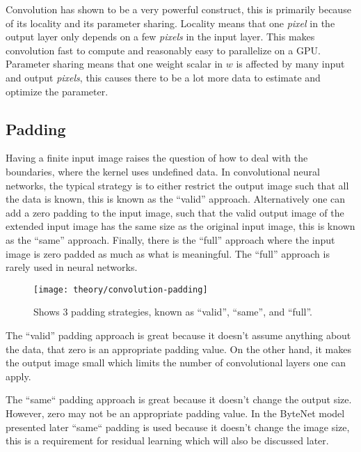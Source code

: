 Convolution has shown to be a very powerful construct, this is primarily because of its locality and its parameter sharing. Locality means that one \textit{pixel} in the output layer only depends on a few \textit{pixels} in the input layer. This makes convolution fast to compute and reasonably easy to parallelize on a GPU. Parameter sharing means that one weight scalar in $w$ is affected by many input and output \textit{pixels}, this causes there to be a lot more data to estimate and optimize the parameter.

\subsection{Padding}
Having a finite input image raises the question of how to deal with the boundaries, where the kernel uses undefined data. In convolutional neural networks, the typical strategy is to either restrict the output image such that all the data is known, this is known as the ``valid'' approach. Alternatively one can add a zero padding to the input image, such that the valid output image of the extended input image has the same size as the original input image, this is known as the ``same'' approach. Finally, there is the ``full'' approach where the input image is zero padded as much as what is meaningful. The ``full'' approach is rarely used in neural networks.

\begin{figure}[h]
	\centering
	\texttt{[image: theory/convolution-padding]}
	\caption{Shows 3 padding strategies, known as ``valid'', ``same'', and ``full''.}
	\label{fig:convolution:padding}
\end{figure}

The ``valid'' padding approach is great because it doesn't assume anything about the data, that zero is an appropriate padding value. On the other hand, it makes the output image small which limits the number of convolutional layers one can apply.

The ``same`` padding approach is great because it doesn't change the output size. However, zero may not be an appropriate padding value. In the ByteNet model presented later ``same`` padding is used because it doesn't change the image size, this is a requirement for residual learning which will also be discussed later.

